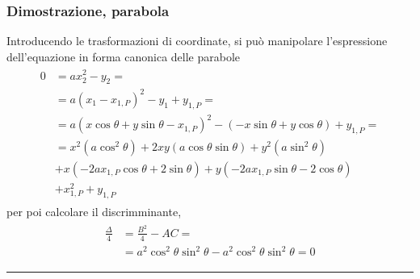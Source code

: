 \documentclass[letterpaper,10pt,italian]{jupyterBook}
\begin{document}
\subsubsection*{Dimostrazione, parabola}

\sphinxAtStartPar
Introducendo le trasformazioni di coordinate, si può manipolare l’espressione dell’equazione in forma canonica delle parabole
\begin{equation*}
\begin{split}\begin{aligned}
  0
  & = a x_2^2 - y_2 = \\
  & = a ( x_1 - x_{1,P} )^2 - y_1 + y_{1,P} = \\
  & = a ( x \cos \theta + y \sin \theta - x_{1,P} )^2 - ( - x \sin \theta + y \cos \theta ) + y_{1,P} = \\
  & = x^2   \left( a \cos^2 \theta \right)
    + 2 x y \left( a \cos \theta \sin \theta \right) 
    + y^2   \left( a \sin^2 \theta \right) \\
  & + x     \left( - 2 a x_{1,P} \cos \theta + 2 \sin \theta \right) 
    + y     \left( - 2 a x_{1,P} \sin \theta - 2 \cos \theta \right) \\
  & + x_{1,P}^2 + y_{1,P}
\end{aligned}\end{split}
\end{equation*}
\sphinxAtStartPar
per poi calcolare il discrimminante,
\begin{equation*}
\begin{split}\begin{aligned}
  \frac{\Delta}{4}
  & = \frac{B^2}{4} - AC = \\
  & = a^2 \cos^2 \theta \sin^2 \theta - a^2 \cos^2 \theta \sin^2 \theta = 0
\end{aligned}\end{split}
\end{equation*}
\sphinxAtStartPar
{} 


\bigskip\hrule\bigskip
\end{document}
